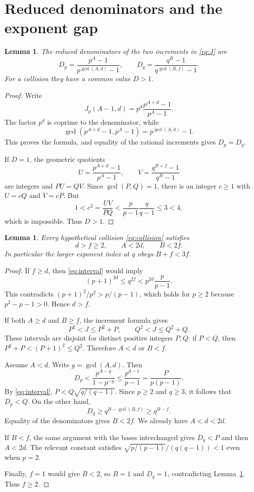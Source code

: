 \documentclass[11pt]{article}
\newtheorem{lemma}[theorem]{Lemma}
\begin{document}
\section{Reduced denominators and the exponent gap}
\begin{lemma}\label{lem:den}
The reduced denominators of the two increments in \eqref{eq:J} are
\[
 D_p=\frac{p^A-1}{p^{\gcd(A,d)}-1},\qquad
 D_q=\frac{q^B-1}{q^{\gcd(B,f)}-1}.
\]
For a collision they have a common value $D>1$.
\end{lemma}
\begin{proof}
Write
\[
 J_p(A-1,d)=p^d\frac{p^{A+d}-1}{p^A-1}.
\]
The factor $p^d$ is coprime to the denominator, while
\[
 \gcd(p^{A+d}-1,p^A-1)=p^{\gcd(A,d)}-1.
\]
This proves the formula, and equality of the rational increments gives $D_p=D_q$.

If $D=1$, the geometric quotients
\[
 U=\frac{p^{A+d}-1}{p^A-1},\qquad
 V=\frac{q^{B+f}-1}{q^B-1}
\]
are integers and $PU=QV$. Since $\gcd(P,Q)=1$, there is an integer $c\ge1$ with $U=cQ$ and $V=cP$. But
\[
 1<c^2=\frac{UV}{PQ}
 <\frac p{p-1}\frac q{q-1}\le3<4,
\]
which is impossible. Thus $D>1$.
\end{proof}

\begin{lemma}\label{lem:gap}
Every hypothetical collision \eqref{eq:collision} satisfies
\[
 \boxed{d>f\ge2,\qquad A<2d,\qquad B<2f.}
\]
In particular the larger exponent index at $q$ obeys $B+f<3f$.
\end{lemma}
\begin{proof}
If $f\ge d$, then \eqref{eq:interval} would imply
\[
 (p+1)^{2d}\le q^{2f}<p^{2d}\frac p{p-1}.
\]
This contradicts $(p+1)^2/p^2>p/(p-1)$, which holds for $p\ge2$ because $p^2-p-1>0$. Hence $d>f$.

If both $A\ge d$ and $B\ge f$, the increment formula gives
\[
 P^2<J\le P^2+P,\qquad Q^2<J\le Q^2+Q.
\]
These intervals are disjoint for distinct positive integers $P,Q$: if $P<Q$, then $P^2+P<(P+1)^2\le Q^2$. Therefore $A<d$ or $B<f$.

Assume $A<d$. Write $g=\gcd(A,d)$. Then
\[
 D_p<\frac{p^{A-g}}{1-p^{-g}}
 \le\frac{p^{d-1}}{p-1}=\frac{P}{p(p-1)}.
\]
By \eqref{eq:interval}, $P<Q\sqrt{q/(q-1)}$. Since $p\ge2$ and $q\ge3$, it follows that $D_p<Q$. On the other hand,
\[
 D_q\ge q^{B-\gcd(B,f)}\ge q^{B-f}.
\]
Equality of the denominators gives $B<2f$. We already have $A<d<2d$.

If $B<f$, the same argument with the bases interchanged gives $D_q<P$ and then $A<2d$. The relevant constant satisfies $\sqrt{p/(p-1)}/(q(q-1))<1$ even when $p=2$.

Finally, $f=1$ would give $B<2$, so $B=1$ and $D_q=1$, contradicting Lemma~\ref{lem:den}. Thus $f\ge2$.
\end{proof}
\end{document}
